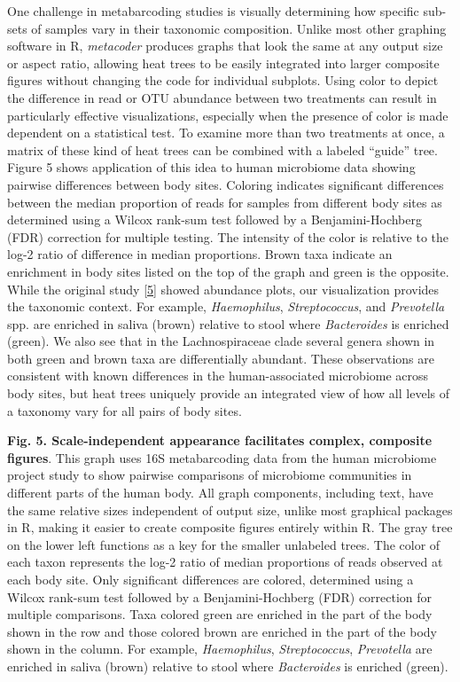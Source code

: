 \documentclass[10pt,letterpaper]{article}
\begin{document}
One challenge in metabarcoding studies is visually determining how
specific sub-sets of samples vary in their taxonomic composition. Unlike
most other graphing software in R, \emph{metacoder} produces graphs that
look the same at any output size or aspect ratio, allowing heat trees to
be easily integrated into larger composite figures without changing the
code for individual subplots. Using color to depict the difference in
read or OTU abundance between two treatments can result in particularly
effective visualizations, especially when the presence of color is made
dependent on a statistical test. To examine more than two treatments at
once, a matrix of these kind of heat trees can be combined with a
labeled ``guide'' tree. Figure 5 shows application of this idea to human
microbiome data showing pairwise differences between body sites.
Coloring indicates significant differences between the median proportion
of reads for samples from different body sites as determined using a
Wilcox rank-sum test followed by a Benjamini-Hochberg (FDR) correction
for multiple testing. The intensity of the color is relative to the
log-2 ratio of difference in median proportions. Brown taxa indicate an
enrichment in body sites listed on the top of the graph and green is the
opposite. While the original study \hyperref[csl:5]{[5]} showed
abundance plots, our visualization provides the taxonomic context. For
example, \emph{Haemophilus}, \emph{Streptococcus}, and \emph{Prevotella}
spp. are enriched in saliva (brown) relative to stool where
\emph{Bacteroides} is enriched (green). We also see that in the
Lachnospiraceae clade several genera shown in both green and brown taxa
are differentially abundant. These observations are consistent with
known differences in the human-associated microbiome across body sites,
but heat trees uniquely provide an integrated view of how all levels of
a taxonomy vary for all pairs of body sites.

\textbf{Fig. 5. Scale-independent appearance facilitates complex,
composite figures}. This graph uses 16S metabarcoding data from the
human microbiome project study to show pairwise comparisons of
microbiome communities in different parts of the human body. All graph
components, including text, have the same relative sizes independent of
output size, unlike most graphical packages in R, making it easier to
create composite figures entirely within R. The gray tree on the lower
left functions as a key for the smaller unlabeled trees. The color of
each taxon represents the log-2 ratio of median proportions of reads
observed at each body site. Only significant differences are colored,
determined using a Wilcox rank-sum test followed by a Benjamini-Hochberg
(FDR) correction for multiple comparisons. Taxa colored green are
enriched in the part of the body shown in the row and those colored
brown are enriched in the part of the body shown in the column. For
example, \emph{Haemophilus}, \emph{Streptococcus}, \emph{Prevotella} are
enriched in saliva (brown) relative to stool where \emph{Bacteroides} is
enriched (green).
\end{document}
